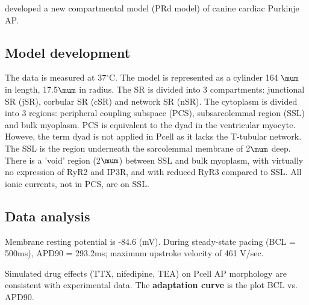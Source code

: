 \citep{li2011} developed a new compartmental model (PRd model) of canine cardiac
Purkinje AP.

\subsection{Model development}

The data is measured at 37$^\circ$C.  The model is represented as a cylinder 164
$\mum$ in length, 17.5$\mum$ in radius. The SR is divided into 3 compartments:
junctional SR (jSR), corbular SR (cSR) and network SR (nSR). The cytoplasm is
divided into 3 regions: peripheral coupling subspace (PCS), subsarcolemmal
region (SSL) and bulk myoplasm. PCS is equivalent to the dyad in the ventricular
myocyte. Howeve, the term dyad is not applied in Pcell as it lacks the T-tubular
network. The SSL is the region underneath the sarcolemmal membrane of 2$\mum$
deep. There is a 'void' region (2$\mum$) between SSL and bulk myoplasm, with
virtually no expression of RyR2 and IP3R, and with reduced RyR3 compared to SSL.
All ionic currents, not in PCS, are on SSL.


\subsection{Data analysis}

Membrane resting potential is -84.6 (mV). During steady-state pacing (BCL =
500ms), APD90 = 293.2ms; maximum upstroke velocity of 461 V/sec.

Simulated drug effects (TTX, nifedipine, TEA) on Pcell AP morphology are
consistent with experimental data. The {\bf adaptation curve} is the plot BCL
vs. APD90. 

